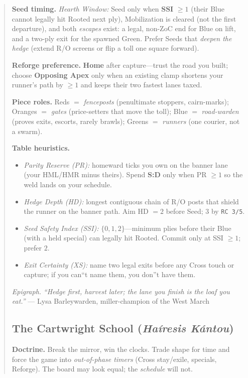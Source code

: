 \documentclass[11pt]{article}
\begin{document}
\begin{quote}
\medskip
\noindent\textbf{Seed timing.} \emph{Hearth Window:} Seed only when \textbf{SSI} $\ge 1$ (their Blue cannot legally hit Rooted next ply), Mobilization is cleared (not the first departure), and both \emph{escapes} exist: a legal, non-ZoC end for Blue on lift, and a two-ply exit for the spawned Green. Prefer Seeds that \emph{deepen the hedge} (extend R/O screens or flip a toll one square forward).

\medskip
\noindent\textbf{Reforge preference.} \textbf{Home} after capture---trust the road you built; choose \textbf{Opposing Apex} only when an existing clamp shortens your runner's path by $\ge 1$ and keeps their two fastest lanes taxed.

\medskip
\noindent\textbf{Piece roles.} Reds $=$ \emph{fenceposts} (penultimate stoppers, cairn-marks); Oranges $=$ \emph{gates} (price-setters that move the toll); Blue $=$ \emph{road-warden} (proves exits, escorts, rarely brawls); Greens $=$ \emph{runners} (one courier, not a swarm).

\medskip
\noindent\textbf{Table heuristics.}
\begin{itemize}[leftmargin=1.3em,itemsep=0.2em]
  \item \emph{Parity Reserve (PR):} homeward ticks you own on the banner lane (your HML/HMR minus theirs). Spend \textbf{S:D} only when PR $\ge 1$ so the weld lands on your schedule.
  \item \emph{Hedge Depth (HD):} longest contiguous chain of R/O posts that shield the runner on the banner path. Aim HD $=2$ before Seed; $3$ by \texttt{RC 3/5}.
  \item \emph{Seed Safety Index (SSI):} $\{0,1,2\}$---minimum plies before their Blue (with a held special) can legally hit Rooted. Commit only at SSI $\ge 1$; prefer $2$.
  \item \emph{Exit Certainty (XS):} name two legal exits before any Cross touch or capture; if you can``t name them, you don''t have them.
\end{itemize}

\medskip
\noindent\textit{Epigraph.} \emph{``Hedge first, harvest later; the lane you finish is the loaf you eat.''} --- Lysa Barleywarden, miller-champion of the West March
\clearpage
\subsection{The Cartwright School (\textit{Haíresis Kántou})}
\noindent\textbf{Doctrine.} Break the mirror, win the clocks. Trade shape for time and force the game into \emph{out-of-phase timers} (Cross stay/exile, specials, Reforge). The board may look equal; the \emph{schedule} will not.


\end{quote}
\end{document}
